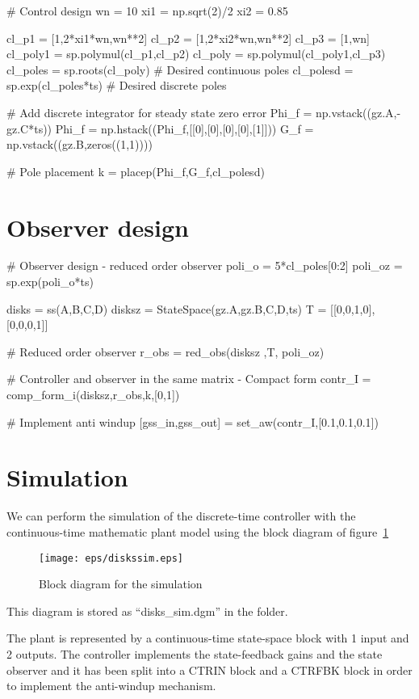 \begin{code}
# Control design
wn = 10
xi1 = np.sqrt(2)/2 
xi2 = 0.85 

cl_p1 = [1,2*xi1*wn,wn**2]
cl_p2 = [1,2*xi2*wn,wn**2]
cl_p3 = [1,wn]
cl_poly1 = sp.polymul(cl_p1,cl_p2)
cl_poly = sp.polymul(cl_poly1,cl_p3)
cl_poles = sp.roots(cl_poly)     # Desired continuous poles
cl_polesd = sp.exp(cl_poles*ts)  # Desired discrete poles

# Add discrete integrator for steady state zero error
Phi_f = np.vstack((gz.A,-gz.C*ts))
Phi_f = np.hstack((Phi_f,[[0],[0],[0],[0],[1]]))
G_f = np.vstack((gz.B,zeros((1,1))))

# Pole placement
k = placep(Phi_f,G_f,cl_polesd)
\end{code}

\section{Observer design}
\begin{code}
# Observer design - reduced order observer
poli_o = 5*cl_poles[0:2]
poli_oz = sp.exp(poli_o*ts) 

disks = ss(A,B,C,D)
disksz = StateSpace(gz.A,gz.B,C,D,ts)
T = [[0,0,1,0],[0,0,0,1]]

# Reduced order observer
r_obs = red_obs(disksz ,T, poli_oz)

# Controller and observer in the same matrix -  Compact form
contr_I = comp_form_i(disksz,r_obs,k,[0,1])

# Implement anti windup
[gss_in,gss_out] = set_aw(contr_I,[0.1,0.1,0.1])
\end{code}

\section{Simulation}

We can perform the simulation of the discrete-time controller with the 
continuous-time mathematic plant model using the block diagram of 
figure~\ref{F21}

\begin{figure}[htbp]	%
\centering
\texttt{[image: eps/diskssim.eps]}
\caption{Block diagram for the simulation}
\label{F21}
\end{figure}

This diagram is stored as ``disks\_sim.dgm'' in the folder.

The plant is represented by a continuous-time state-space block with 1 input 
and 2 outputs.
The controller implements the state-feedback gains and the state observer 
and it has been split into a CTRIN block and a CTRFBK block in order to 
implement the anti-windup mechanism.

